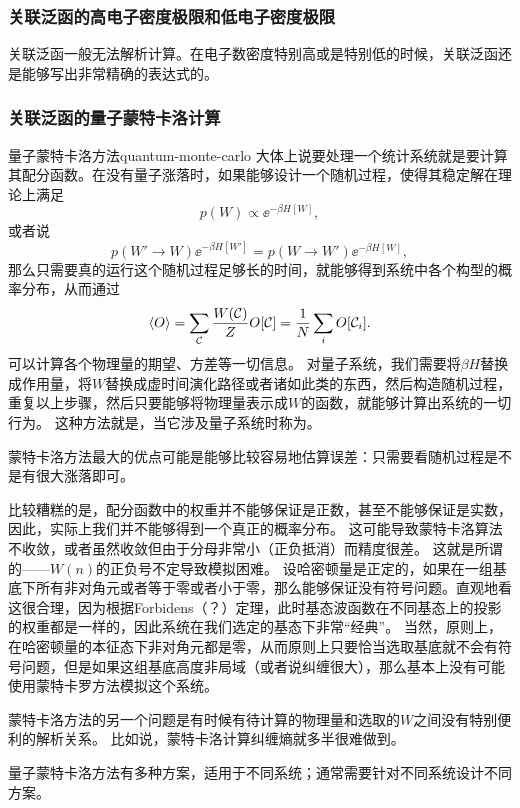 \subsubsection{关联泛函的高电子密度极限和低电子密度极限}

关联泛函一般无法解析计算。在电子数密度特别高或是特别低的时候，关联泛函还是能够写出非常精确的表达式的。

\subsubsection{关联泛函的量子蒙特卡洛计算}

\begin{back}{量子蒙特卡洛方法}{quantum-monte-carlo}
    大体上说要处理一个统计系统就是要计算其配分函数。在没有量子涨落时，如果能够设计一个随机过程，使得其稳定解在理论上满足
    \[
        p(W) \propto \ee^{- \beta H[W]},
    \]
    或者说
    \[
        p(W' \to W) \ee^{-\beta H[W']} = p(W \to W') \ee^{- \beta H[W]},
    \]
    那么只需要真的运行这个随机过程足够长的时间，就能够得到系统中各个构型的概率分布，从而通过
    \begin{equation}
        \expval{O} = \sum_{\mathcal{C}} \frac{W(\mathcal{C})}{Z} O[\mathcal{C}] = \frac{1}{N} \sum_i O[\mathcal{C}_i].
        \label{eq:classical-expectation}
    \end{equation}
    可以计算各个物理量的期望、方差等一切信息。
    对量子系统，我们需要将$\beta H$替换成作用量，将$W$替换成虚时间演化路径或者诸如此类的东西，然后构造随机过程，重复以上步骤，然后只要能够将物理量表示成$W$的函数，就能够计算出系统的一切行为。
    这种方法就是，当它涉及量子系统时称为。

    蒙特卡洛方法最大的优点可能是能够比较容易地估算误差：只需要看随机过程是不是有很大涨落即可。

    比较糟糕的是，配分函数中的权重并不能够保证是正数，甚至不能够保证是实数，因此，实际上我们并不能够得到一个真正的概率分布。
    这可能导致蒙特卡洛算法不收敛，或者虽然收敛但由于分母非常小（正负抵消）而精度很差。
    这就是所谓的——$W(n)$的正负号不定导致模拟困难。
    设哈密顿量是正定的，如果在一组基底下所有非对角元或者等于零或者小于零，那么能够保证没有符号问题。直观地看这很合理，因为根据Forbidens（？）定理，此时基态波函数在不同基态上的投影的权重都是一样的，因此系统在我们选定的基态下非常“经典”。
    当然，原则上，在哈密顿量的本征态下非对角元都是零，从而原则上只要恰当选取基底就不会有符号问题，但是如果这组基底高度非局域（或者说纠缠很大），那么基本上没有可能使用蒙特卡罗方法模拟这个系统。

    蒙特卡洛方法的另一个问题是有时候有待计算的物理量和选取的$W$之间没有特别便利的解析关系。
    比如说，蒙特卡洛计算纠缠熵就多半很难做到。

    量子蒙特卡洛方法有多种方案，适用于不同系统；通常需要针对不同系统设计不同方案。
\end{back}

